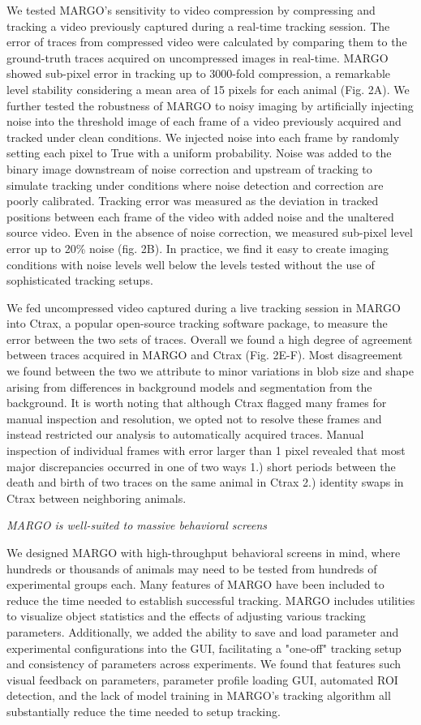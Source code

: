 \documentclass[10pt]{article}
\begin{document}
\begin{multicols}{2}
We tested MARGO's sensitivity to video compression by compressing and tracking a video previously captured during a real-time tracking session. The error of traces from compressed video were calculated by comparing them to the ground-truth traces acquired on uncompressed images in real-time. MARGO showed sub-pixel error in tracking up to 3000-fold compression, a remarkable level stability considering a mean area of 15 pixels for each animal (Fig. 2A). We further tested the robustness of MARGO to noisy imaging by artificially injecting noise into the threshold image of each frame of a video previously acquired and tracked under clean conditions. We injected noise into each frame by randomly setting each pixel to True with a uniform probability. Noise was added to the binary image downstream of noise correction and upstream of tracking to simulate tracking under conditions where noise detection and correction are poorly calibrated. Tracking error was measured as the deviation in tracked positions between each frame of the video with added noise and the unaltered source video.  Even in the absence of noise correction, we measured sub-pixel level error up to 20\% noise (fig. 2B). In practice, we find it easy to create imaging conditions with noise levels well below the levels tested without the use of sophisticated tracking setups.

We fed uncompressed video captured during a live tracking session in MARGO into Ctrax, a popular open-source tracking software package, to measure the error between the two sets of traces. Overall we found a high degree of agreement between traces acquired in MARGO and Ctrax (Fig. 2E-F). Most disagreement we found between the two we attribute to minor variations in blob size and shape arising from differences in background models and segmentation from the background. It is worth noting that although Ctrax flagged many frames for manual inspection and resolution, we opted not to resolve these frames and instead restricted our analysis to automatically acquired traces. Manual inspection of individual frames with error larger than 1 pixel revealed that most major discrepancies occurred in one of two ways 1.) short periods between the death and birth of two traces on the same animal in Ctrax 2.) identity swaps in Ctrax between neighboring animals.

\textit{MARGO is well-suited to massive behavioral screens}

We designed MARGO with high-throughput behavioral screens in mind, where hundreds or thousands of animals may need to be tested from hundreds of experimental groups each. Many features of MARGO have been included to reduce the time needed to establish successful tracking. MARGO includes utilities to visualize object statistics and the effects of adjusting various tracking parameters. Additionally, we added the ability to save and load parameter and experimental configurations into the GUI, facilitating a "one-off" tracking setup and consistency of parameters across experiments. We found that features such visual feedback on parameters, parameter profile loading GUI, automated ROI detection, and the lack of model training in MARGO's tracking algorithm  all substantially reduce the time needed to setup tracking. 


\end{multicols}
\end{document}
